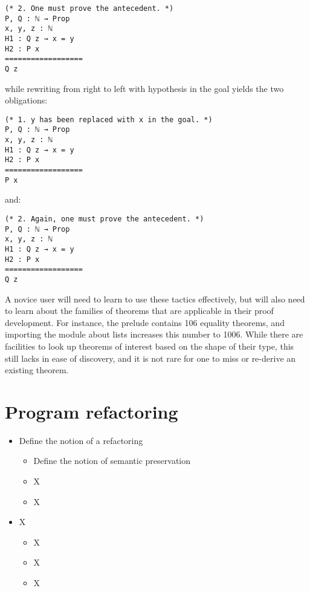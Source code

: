 \begin{verbatim}
(* 2. One must prove the antecedent. *)
P, Q : ℕ → Prop
x, y, z : ℕ
H1 : Q z → x = y
H2 : P x
==================
Q z
\end{verbatim}

while rewriting from right to left with hypothesis  in the goal
yields the two obligations:

\begin{verbatim}
(* 1. y has been replaced with x in the goal. *)
P, Q : ℕ → Prop
x, y, z : ℕ
H1 : Q z → x = y
H2 : P x
==================
P x
\end{verbatim}

and:

\begin{verbatim}
(* 2. Again, one must prove the antecedent. *)
P, Q : ℕ → Prop
x, y, z : ℕ
H1 : Q z → x = y
H2 : P x
==================
Q z
\end{verbatim}

A novice user will need to learn to use these tactics effectively, but will also
need to learn about the families of theorems that are applicable in their proof
development.  For instance, the \Coq{} prelude contains 106 equality theorems,
and importing the module about lists increases this number to 1006.  While there
are facilities to look up theorems of interest based on the shape of their type,
this still lacks in ease of discovery, and it is not rare for one to miss or
re-derive an existing theorem.

\section{Program refactoring}

\begin{itemize}

  \item Define the notion of a refactoring

        \begin{itemize}

          \item Define the notion of semantic preservation

          \item X

          \item X

        \end{itemize}

  \item X

        \begin{itemize}

          \item X

          \item X

          \item X

        \end{itemize}

\end{itemize}
